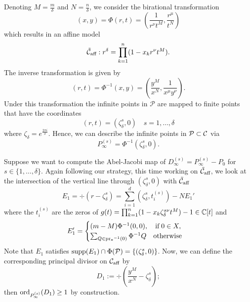 \documentclass[main.tex]{subfiles}
\begin{document}
  Denoting $M = \frac{m}\delta$ and $N = \frac{n}\delta$, we consider the birational transformation
  \begin{equation*}
   (x,y) = \Phi(r,t) = \left(\frac{1}{r^{\nu}t^M},\frac{r^{\mu}}{t^N}\right)
  \end{equation*}
  which results in an affine model
  \begin{equation*}
   \tilde{\mathcal{C}}_{\text{aff}} : r^{\delta} = \prod_{k=1}^n (1-x_kr^{\nu}t^M).
  \end{equation*}
  The inverse transformation is given by
  \begin{equation*}
   (r,t) = \Phi^{-1}(x,y) = \left(\frac{y^M}{x^N},\frac{1}{x^{\mu}y^{\nu}}\right).
  \end{equation*}
  Under this transformation the infinite points in $\mathcal{P}$ are mapped to finite points that have the coordinates
  \begin{equation*}
   (r,t) = (\zeta_{\delta}^s,0) \quad s= 1,\dots,\delta
  \end{equation*}
  where $\zeta_{\delta} = e^{\frac{2\pi i }{\delta}}$. 
  Hence, we can describe the infinite points in $\mathcal{P} \subset \mathcal{C}$ via
   \begin{equation*}
      P_{\infty}^{(s)} = \Phi^{-1}(\zeta_{\delta}^s,0).
   \end{equation*}
   
   
   Suppose we want to compute the Abel-Jacobi map of $D_{\infty}^{(s)} = P_{\infty}^{(s)} - P_0$ for $s \in \{1,\dots,\delta\}$.
   Again following our strategy,
   this time working on $\tilde{\mathcal{C}}_{\text{aff}}$, we look at the intersection of the vertical line through $(\zeta_{\delta}^s,0)$ with
   $\tilde{\mathcal{C}}_{\text{aff}}$
   \begin{equation*}
      E_1 = \div(r - \zeta_{\delta}^s) = \sum_{i = 1}^{d} \left(\zeta_{\delta}^s,t_i^{(s)}\right) - N E_1'
   \end{equation*}
      where the $t_i^{(s)}$ are the zeros of $g(t) = \prod_{k=1}^n (1-x_k\zeta_{\delta}^{s\nu}t^M) - 1 \in \mathbb{C}[t]$ and
    \begin{equation}\label{eq:zero_bp1}
       E_1' = \begin{cases}
	     (m-M) \Phi^{-1}(0,0), \quad \text{if} \; 0 \in X, \\
             \sum_{Q \in \operatorname{pr_x}^{-1}(0)} \Phi^{-1}Q \quad \text{otherwise}
            \end{cases}
    \end{equation}
    Note that $E_1$ satisfies $\operatorname{supp}(E_1) \cap \Phi(\mathcal{P}) = \{ (\zeta_{\delta}^s,0) \}$.
    Now, we can define the corresponding principal divisor on $\mathcal{C}_{\text{aff}}$ by
    \begin{equation*}
       D_1 := \div \left( \frac{y^M}{x^N} - \zeta_{\delta}^s \right);
    \end{equation*}
   then $\operatorname{ord}_{P_{\infty}^{(s)}}(D_1) \ge 1$ by construction.
    
\end{document}

